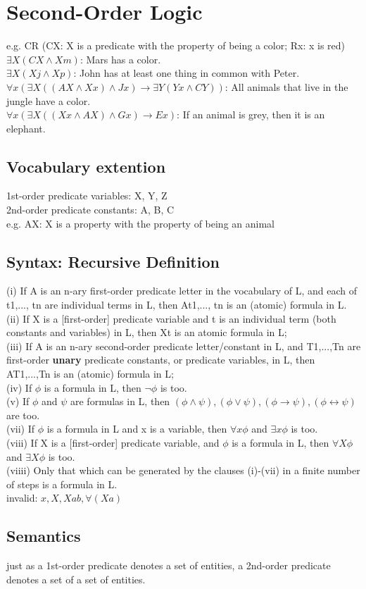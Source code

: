 \section{Second-Order Logic}
e.g. CR (CX: X is a predicate with the property of being a color; Rx: x is red) \\
$\exists X(CX \land Xm)$: Mars has a color. \\
$\exists X(Xj \land Xp)$: John has at least one thing in common with Peter. \\
$\forall x (\exists X ((AX \land Xx) \land Jx) \to \exists Y (Yx \land CY))$: All animals that live in the jungle have a color.\\
$\forall x (\exists X ((Xx \land AX) \land Gx) \to Ex)$: If an animal is grey, then it is an elephant.
\subsection*{Vocabulary extention}
1st-order predicate variables: X, Y, Z\\
2nd-order predicate constants: A, B, C\\
e.g. AX: X is a property with the property of being an animal
\subsection*{Syntax: Recursive Definition}
(i) If A is an n-ary first-order predicate letter in the vocabulary of L, and each of t1,..., tn are individual terms in L, then At1,..., tn is an (atomic) formula in L.\\
(ii) If X is a [first-order] predicate variable and t is an individual term (both constants and variables) in L, then Xt is an atomic formula in L;\\
(iii) If A is an n-ary second-order predicate letter/constant in L, and
T1,...,Tn are first-order \textbf{unary} predicate constants, or predicate
variables, in L, then AT1,...,Tn is an (atomic) formula in L;\\
(iv) If $\phi$ is a formula in L, then $\neg \phi$ is too.\\
(v) If $\phi$ and $\psi$ are formulas in L, then $(\phi \land \psi), (\phi \lor \psi), (\phi \to \psi), (\phi \leftrightarrow \psi)$ are too.\\
(vii) If $\phi$ is a formula in L and x is a variable, then $\forall x \phi$ and $\exists x \phi$ is too.\\
(viii) If X is a [first-order] predicate variable, and $\phi$ is a formula in L, then $\forall X \phi$ and $\exists X \phi$ is too.\\
(viiii) Only that which can be generated by the clauses (i)-(vii) in a finite number of steps is a formula in L.\\
invalid: $x, X, Xab, \forall(Xa)$
\subsection*{Semantics}
just as a 1st-order predicate denotes a set of entities, a 2nd-order predicate denotes a set of a
set of entities.